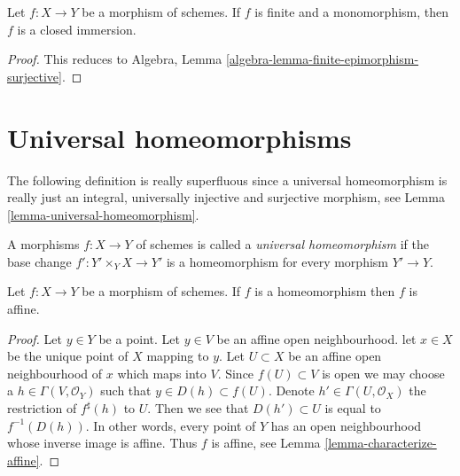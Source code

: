 \begin{lemma}
\label{lemma-finite-monomorphism-closed}
Let $f : X \to Y$ be a morphism of schemes.
If $f$ is finite and a monomorphism, then $f$ is a closed immersion.
\end{lemma}

\begin{proof}
This reduces to
Algebra, Lemma \ref{algebra-lemma-finite-epimorphism-surjective}.
\end{proof}







\section{Universal homeomorphisms}
\label{section-universal-homeomorphisms}

\noindent
The following definition is really superfluous since a universal
homeomorphism is really just an integral, universally injective
and surjective morphism, see
Lemma \ref{lemma-universal-homeomorphism}.

\begin{definition}
\label{definition-universal-homeomorphism}
A morphisms $f : X \to Y$ of schemes is called a {\it universal homeomorphism}
if the base change $f' : Y' \times_Y X \to Y'$ is a homeomorphism for
every morphism $Y' \to Y$.
\end{definition}

\begin{lemma}
\label{lemma-homeomorphism-affine}
Let $f : X \to Y$ be a morphism of schemes.
If $f$ is a homeomorphism then $f$ is affine.
\end{lemma}

\begin{proof}
Let $y \in Y$ be a point. Let $y \in V$ be an affine open neighbourhood.
let $x \in X$ be the unique point of $X$ mapping to $y$.
Let $U \subset X$ be an affine open neighbourhood of $x$ which maps into $V$.
Since $f(U) \subset V$ is open we may choose a $h \in \Gamma(V, \mathcal{O}_Y)$
such that $y \in D(h) \subset f(U)$. Denote $h' \in \Gamma(U, \mathcal{O}_X)$
the restriction of $f^\sharp(h)$ to $U$. Then we see that
$D(h') \subset U$ is equal to $f^{-1}(D(h))$. In other words, every point
of $Y$ has an open neighbourhood whose inverse image is affine.
Thus $f$ is affine, see
Lemma \ref{lemma-characterize-affine}.
\end{proof}

